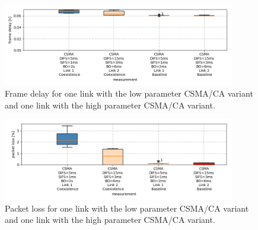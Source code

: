 \begin{figure}[tb]
	\label{fig:results-csma-15-5-frame-delay}
	\begin{center}
		\includegraphics[width=0.9\textwidth]{pictures/results/different_combinations/csma_inhomogeneous/15_5/frame_delay_boxplot}
	\end{center}
	\caption{Frame delay for one link with the low parameter CSMA/CA variant and one link with the high parameter CSMA/CA variant.}
\end{figure}

\begin{figure}[bt]
	\label{fig:results-csma-15-5-packet-loss}
	\begin{center}
		\includegraphics[width=0.9\textwidth]{pictures/results/different_combinations/csma_inhomogeneous/15_5/packet_loss_boxplot}	
	\end{center}
	\caption{Packet loss for one link with the low parameter CSMA/CA variant and one link with the high parameter CSMA/CA variant.}
\end{figure}

